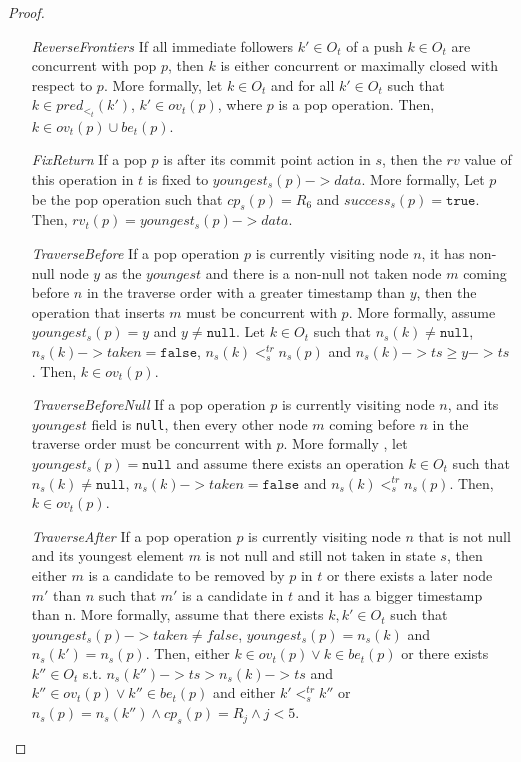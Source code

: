 \begin{proof}
\begin{itemize}
\item[\emph{ReverseFrontiers}] If all immediate followers $k' \in O_t$ of a push $k \in O_t$ are concurrent with pop $p$, then $k$ is either concurrent or maximally closed with respect to $p$. More formally, let $k \in O_t$ and for all $k' \in O_t$ such that $k \in pred_{<_t}(k')$, $k' \in ov_t(p)$, where $p$ is a pop operation. Then, $k \in ov_t(p) \cup be_t(p)$. 
\item[\emph{FixReturn}] If a pop $p$ is after its commit point action in $s$, then the $rv$ value of this operation in $t$ is fixed to $youngest_s(p)->data$. More formally, Let $p$ be the pop operation such that $cp_s(p) = R_6$ and $success_s(p) = \texttt{true}$. Then, $rv_t(p) = youngest_s(p)->data$. 
\item[\emph{TraverseBefore}] If a pop operation $p$ is currently visiting node $n$, it has non-null node $y$ as the $youngest$ and there is a non-null not taken node $m$ coming before $n$ in the traverse order with a greater timestamp than $y$, then the operation that inserts $m$ must be concurrent with $p$. More formally, assume $youngest_s(p) = y$ and $ y \neq \texttt{null}$. Let $k \in O_t$ such that $n_s(k) \neq \texttt{null}$, $n_s(k)->taken = \texttt{false}$, $n_s(k) <^{tr}_s n_s(p)$ and $n_s(k)->ts \geq y->ts$. Then, $k \in ov_t(p)$.
\item[\emph{TraverseBeforeNull}] If a pop operation $p$ is currently visiting node $n$, and its $youngest$ field is \texttt{null}, then every other node $m$ coming before $n$ in the traverse order must be concurrent with $p$. More formally , let $youngest_s(p) = \texttt{null}$ and assume there exists  an operation $k \in O_t$ such that $n_s(k) \neq \texttt{null}$, $n_s(k)->taken = \texttt{false}$ and  $n_s(k) <^{tr}_s n_s(p)$. Then, $k \in ov_t(p)$. 
\item[\emph{TraverseAfter}] If a pop operation $p$ is currently visiting node $n$ that is not null and its youngest element $m$ is not null and still not taken in state $s$, then either $m$ is a candidate to be removed by $p$ in $t$ or there exists a later node $m'$ than $n$ such that $m'$ is a candidate in $t$ and it has a bigger timestamp than n. More formally, assume that there exists $k, k' \in O_t$ such that $youngest_s(p)->taken \neq false$, $youngest_s(p) = n_s(k)$ and $n_s(k') = n_s(p)$. Then, either $k \in ov_t(p) \vee k \in be_t(p)$ or there exists $k'' \in O_t$ s.t. $n_s(k'')->ts > n_s(k) ->ts$ and $k'' \in ov_t(p) \vee k'' \in be_t(p)$ and either $k' <^{tr}_s k''$ or $n_s(p) = n_s(k'') \wedge cp_s(p) = R_j \wedge j<5$. 

\end{itemize}
\end{proof}
